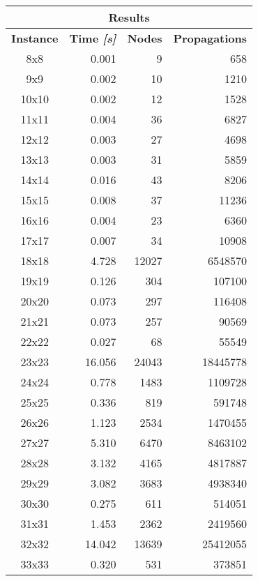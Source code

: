 \begin{center}
    \begin{tabular}{|c|r|r|r|}
        \hline
        \multicolumn{4}{|c|}{\textbf{Results}} \\
        \hline
        \textbf{Instance} & \textbf{Time \textit{[s]}} & \textbf{Nodes} & \textbf{Propagations} \\
        \hline
        8x8 & 0.001 & 9 & 658 \\ \hline
        9x9 & 0.002 & 10 & 1210 \\ \hline
        10x10 & 0.002 & 12 & 1528 \\ \hline
        11x11 & 0.004 & 36 & 6827 \\ \hline
        12x12 & 0.003 & 27 & 4698 \\ \hline
        13x13 & 0.003 & 31 & 5859 \\ \hline
        14x14 & 0.016 & 43 & 8206 \\ \hline
        15x15 & 0.008 & 37 & 11236 \\ \hline
        16x16 & 0.004 & 23 & 6360 \\ \hline
        17x17 & 0.007 & 34 & 10908 \\ \hline
        18x18 & 4.728 & 12027 & 6548570 \\ \hline
        19x19 & 0.126 & 304 & 107100 \\ \hline
        20x20 & 0.073 & 297 & 116408 \\ \hline
        21x21 & 0.073 & 257 & 90569 \\ \hline
        22x22 & 0.027 & 68 & 55549 \\ \hline
        23x23 & 16.056 & 24043 & 18445778 \\ \hline
        24x24 & 0.778 & 1483 & 1109728 \\ \hline
        25x25 & 0.336 & 819 & 591748 \\ \hline
        26x26 & 1.123 & 2534 & 1470455 \\ \hline
        27x27 & 5.310 & 6470 & 8463102 \\ \hline
        28x28 & 3.132 & 4165 & 4817887 \\ \hline
        29x29 & 3.082 & 3683 & 4938340 \\ \hline
        30x30 & 0.275 & 611 & 514051 \\ \hline
        31x31 & 1.453 & 2362 & 2419560 \\ \hline
        32x32 & 14.042 & 13639 & 25412055 \\ \hline
        33x33 & 0.320 & 531 & 373851 \\ \hline

\end{tabular}
\end{center}
